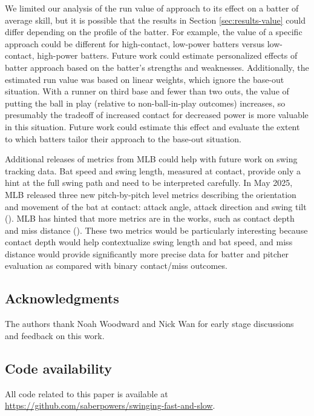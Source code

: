 \documentclass{article}
\begin{document}
      We limited our analysis of the run value of approach to its effect on a batter of average skill, but it is possible that the results in Section \ref{sec:results-value} could differ depending on the profile of the batter. For example, the value of a specific approach could be different for high-contact, low-power batters versus low-contact, high-power batters. Future work could estimate personalized effects of batter approach based on the batter's strengths and weaknesses. Additionally, the estimated run value was based on linear weights, which ignore the base-out situation. With a runner on third base and fewer than two outs, the value of putting the ball in play (relative to non-ball-in-play outcomes) increases, so presumably the tradeoff of increased contact for decreased power is more valuable in this situation. Future work could estimate this effect and evaluate the extent to which batters tailor their approach to the base-out situation.

      Additional releases of metrics from MLB could help with future work on swing tracking data. Bat speed and swing length, measured at contact, provide only a hint at the full swing path and need to be interpreted carefully. In May 2025, MLB released three new pitch-by-pitch level metrics describing the orientation and movement of the bat at contact: attack angle, attack direction and swing tilt (\cite{petriello_4_2025}). MLB has hinted that more metrics are in the works, such as contact depth and miss distance (\cite{petriello_everything_2024}). These two metrics would be particularly interesting because contact depth would help contextualize swing length and bat speed, and miss distance would provide significantly more precise data for batter and pitcher evaluation as compared with binary contact/miss outcomes.

  \subsection*{Acknowledgments}

    The authors thank Noah Woodward and Nick Wan for early stage discussions and feedback on this work.

  \subsection*{Code availability}

  All code related to this paper is available at \url{https://github.com/saberpowers/swinging-fast-and-slow}.

  \printbibliography
\end{document}
